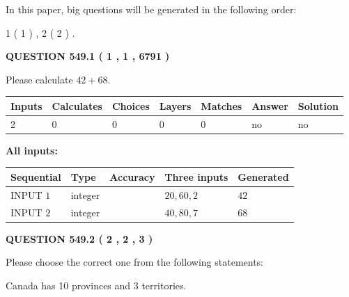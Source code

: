 \documentclass[12pt]{article}
\begin{document}
In this paper, big questions will be generated in the following order: 
   
   
   1 ( 1 )
 ,
   2 ( 2 )
 .
  
\vspace{0.2in}
  
{\textbf{\Large{QUESTION
549.1 
 ( 1 , 1 , 6791 )
}}}
  
  
 
Please calculate $ %
42 +  %
68 $.
 
 
   
   
   
   
\noindent\begin{tabular}{|l|l|l|l|l|l|l|}
 \hline
Inputs & Calculates & Choices & Layers & Matches & Answer & Solution \\ \hline
 2  & 
 0  & 
 0
  & 
 0  & 
 0  & 
  no & 
  no 
  \\ \hline
 \end{tabular}
   
   
   
   
\noindent{}
   
   
   
   
\noindent\vspace{0.1in}\hspace{-0.08in} {\textbf{\Large{All inputs: }}}
   
   
  
  
\noindent\begin{tabular}{|l|l|l|l|l|}
\hline
 Sequential & Type & Accuracy & Three inputs & Generated \\ 
\hline
 
 
  INPUT $  1 $ & integer &  & $
 20
 , 
 60
 , 
 2
 $ & $ 42 $ 
 \\  \hline  
 
 
  INPUT $  2 $ & integer &  & $
 40
 , 
 80
 , 
 7
 $ & $ 68 $ 
 \\  \hline  
 \end{tabular}
   
   
  
\vspace{0.2in}
  
{\textbf{\Large{QUESTION
549.2 
 ( 2 , 2 , 3 )
}}}
  
  
Please choose the correct one from the following statements:
 
 
Canada has 10  provinces and 3 territories.
 
\end{document}
